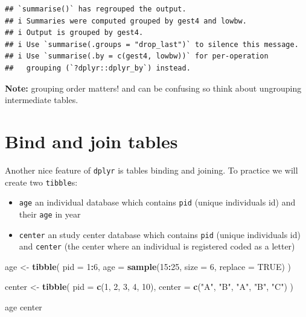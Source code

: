 \documentclass[
]{book}
\newenvironment{Shaded}{\begin{snugshade}}{\end{snugshade}}
\newcommand{\AttributeTok}[1]{\textcolor[rgb]{0.13,0.29,0.53}{#1}}
\newcommand{\ConstantTok}[1]{\textcolor[rgb]{0.56,0.35,0.01}{#1}}
\newcommand{\DecValTok}[1]{\textcolor[rgb]{0.00,0.00,0.81}{#1}}
\newcommand{\FunctionTok}[1]{\textcolor[rgb]{0.13,0.29,0.53}{\textbf{#1}}}
\newcommand{\NormalTok}[1]{#1}
\newcommand{\OtherTok}[1]{\textcolor[rgb]{0.56,0.35,0.01}{#1}}
\newcommand{\SpecialCharTok}[1]{\textcolor[rgb]{0.81,0.36,0.00}{\textbf{#1}}}
\newcommand{\StringTok}[1]{\textcolor[rgb]{0.31,0.60,0.02}{#1}}
\providecommand{\tightlist}{%
  \setlength{\itemsep}{0pt}\setlength{\parskip}{0pt}}
\begin{document}
\begin{verbatim}
## `summarise()` has regrouped the output.
## i Summaries were computed grouped by gest4 and lowbw.
## i Output is grouped by gest4.
## i Use `summarise(.groups = "drop_last")` to silence this message.
## i Use `summarise(.by = c(gest4, lowbw))` for per-operation
##   grouping (`?dplyr::dplyr_by`) instead.
\end{verbatim}

\textbf{Note:} grouping order matters! and can be confusing so think about ungrouping intermediate tables.

\section{Bind and join tables}\label{bind-and-join-tables}

Another nice feature of \texttt{dplyr} is tables binding and joining. To practice we will create two \texttt{tibble}s:

\begin{itemize}
\tightlist
\item
  \texttt{age} an individual database which contains \texttt{pid} (unique individuals id)
  and their \texttt{age} in year
\item
  \texttt{center} an study center database which contains \texttt{pid} (unique individuals id)
  and \texttt{center} (the center where an individual is registered coded as a letter)
\end{itemize}

\begin{Shaded}
\begin{Highlighting}[]
\NormalTok{age }\OtherTok{\textless{}{-}}
  \FunctionTok{tibble}\NormalTok{(}
    \AttributeTok{pid =} \DecValTok{1}\SpecialCharTok{:}\DecValTok{6}\NormalTok{,}
    \AttributeTok{age =} \FunctionTok{sample}\NormalTok{(}\DecValTok{15}\SpecialCharTok{:}\DecValTok{25}\NormalTok{, }\AttributeTok{size =} \DecValTok{6}\NormalTok{, }\AttributeTok{replace =} \ConstantTok{TRUE}\NormalTok{)}
\NormalTok{  )}

\NormalTok{center }\OtherTok{\textless{}{-}}
  \FunctionTok{tibble}\NormalTok{(}
    \AttributeTok{pid =} \FunctionTok{c}\NormalTok{(}\DecValTok{1}\NormalTok{, }\DecValTok{2}\NormalTok{, }\DecValTok{3}\NormalTok{, }\DecValTok{4}\NormalTok{, }\DecValTok{10}\NormalTok{),}
    \AttributeTok{center =} \FunctionTok{c}\NormalTok{(}\StringTok{"A"}\NormalTok{, }\StringTok{"B"}\NormalTok{, }\StringTok{"A"}\NormalTok{, }\StringTok{"B"}\NormalTok{, }\StringTok{"C"}\NormalTok{)}
\NormalTok{  )}

\NormalTok{age}
\NormalTok{center}
\end{Highlighting}
\end{Shaded}
\end{document}
